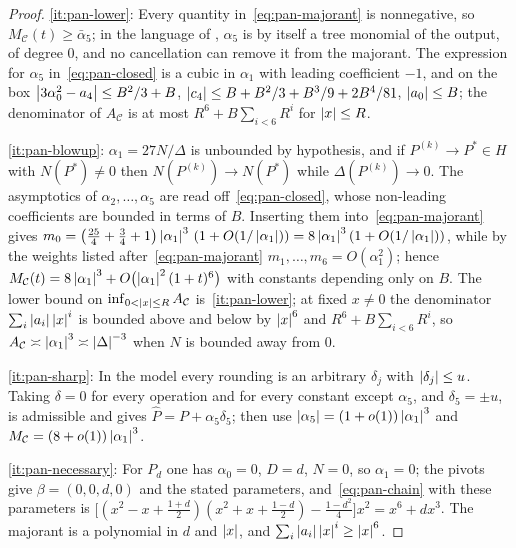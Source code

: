 \begin{proof}
\ref{it:pan-lower}: Every quantity in~\eqref{eq:pan-majorant} is nonnegative,
so $M_{\mathcal C}(t)\ge\bar\alpha_5$; in the language of
, $\alpha_5$ is by itself a tree monomial of the
output, of degree $0$, and no cancellation can remove it from the majorant.
The expression for $\alpha_5$ in~\eqref{eq:pan-closed} is a cubic in
$\alpha_1$ with leading coefficient $-1$, and on the box
$\left\lvert 3\alpha_0^2-a_4\right\rvert\le B^2/3+B$, $\left\lvert c_4\right\rvert\le B+B^2/3+B^3/9+2B^4/81$,
$\left\lvert a_0\right\rvert\le B$; the denominator of $A_{\mathcal C}$ is at most
$R^6+B\sum_{i<6}R^i$ for $\left\lvert x\right\rvert\le R$.

\ref{it:pan-blowup}: $\alpha_1=27N/\Delta$ is unbounded by hypothesis, and
if $P^{(k)}\to P^*\in H$ with $N(P^*)\ne0$ then $N(P^{(k)})\to N(P^*)$
while $\Delta(P^{(k)})\to0$.  The asymptotics of $\alpha_2,\dots,\alpha_5$
are read off~\eqref{eq:pan-closed}, whose non-leading coefficients are
bounded in terms of $B$.  Inserting them into~\eqref{eq:pan-majorant} gives
$m_0=\bigl(\tfrac{25}{4}+\tfrac34+1\bigr)\left\lvert \alpha_1\right\rvert^3\,(1+O(1/\left\lvert \alpha_1\right\rvert))
=8\left\lvert \alpha_1\right\rvert^3(1+O(1/\left\lvert \alpha_1\right\rvert))$, while by the weights listed
after~\eqref{eq:pan-majorant} $m_1,\dots,m_6=O(\alpha_1^2)$; hence
$M_{\mathcal C}(t)=8\left\lvert \alpha_1\right\rvert^3+O\bigl(\left\lvert \alpha_1\right\rvert^2(1+t)^6\bigr)$
with constants depending only on $B$.  The lower bound on
$\inf_{0<\left\lvert x\right\rvert\le R}A_{\mathcal C}$ is~\ref{it:pan-lower}; at fixed
$x\ne0$ the denominator $\sum_i\left\lvert a_i\right\rvert\left\lvert x\right\rvert^i$ is bounded above and below
by $\left\lvert x\right\rvert^6$ and $R^6+B\sum_{i<6}R^i$, so
$A_{\mathcal C}\asymp\left\lvert \alpha_1\right\rvert^3\asymp\left\lvert \Delta\right\rvert^{-3}$ when $N$ is
bounded away from $0$.

\ref{it:pan-sharp}: In the model every rounding is an arbitrary
$\delta_j$ with $\left\lvert \delta_j\right\rvert\le u$.  Taking $\delta=0$ for every operation
and for every constant except $\alpha_5$, and $\delta_5=\pm u$, is
admissible and gives $\widehat P=P+\alpha_5\delta_5$; then use
$\left\lvert \alpha_5\right\rvert=(1+o(1))\left\lvert \alpha_1\right\rvert^3$ and $M_{\mathcal C}=(8+o(1))\left\lvert \alpha_1\right\rvert^3$.

\ref{it:pan-necessary}: For $P_d$ one has $\alpha_0=0$, $D=d$, $N=0$, so
$\alpha_1=0$; the pivots give $\beta=(0,0,d,0)$ and the stated parameters,
and~\eqref{eq:pan-chain} with these parameters is
$\bigl[(x^2-x+\tfrac{1+d}2)(x^2+x+\tfrac{1-d}2)-\tfrac{1-d^2}4\bigr]x^2
=x^6+dx^3$.  The majorant is a polynomial in $d$ and $\left\lvert x\right\rvert$, and
$\sum_i\left\lvert a_i\right\rvert\left\lvert x\right\rvert^i\ge\left\lvert x\right\rvert^6$.
\end{proof}

